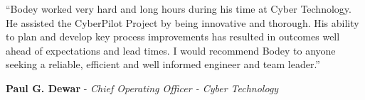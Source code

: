 \documentclass[10pt, a4paper]{report}
\begin{document}
{ 
``Bodey worked very hard and long hours during his time at Cyber Technology. He assisted the CyberPilot Project by being innovative and thorough. His ability to plan and develop key process improvements has resulted in outcomes well ahead of expectations and lead times. I would recommend Bodey to anyone seeking a reliable, efficient and well informed engineer and team leader.''}

{\small \hspace*{1em} {\bf Paul G. Dewar} - {\em Chief Operating Officer - Cyber Technology}}
\end{document}
